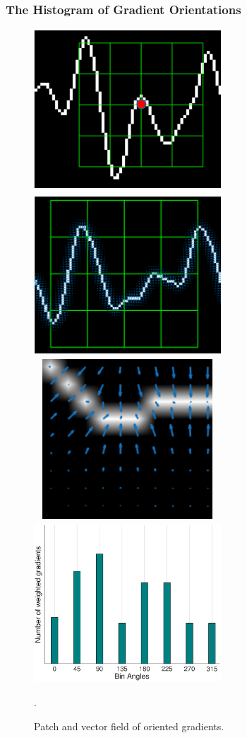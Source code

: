 \documentclass[aspectratio=169]{beamer}
\begin{document}
\begin{frame}
\frametitle{The Histogram of Gradient Orientations}
\begin{center}
\begin{figure}[h!]
\centering
\includegraphics[width=7cm, height=6cm]{images/signalpatchkeypoint.png}
\includegraphics[width=7cm, height=6.1cm]{images/gradientsdescriptors.png}
\includegraphics[width=7cm, height=6cm]{images/samplegradients.png}
\includegraphics[width=7cm, height=6cm]{images/histogramchart.eps}
\caption[Histogram of Gradient Orientations]{Patch and vector field of oriented gradients.}.
\label{fig:sampledescriptor}
\end{figure}
\end{center}
\end{frame}
\end{document}

